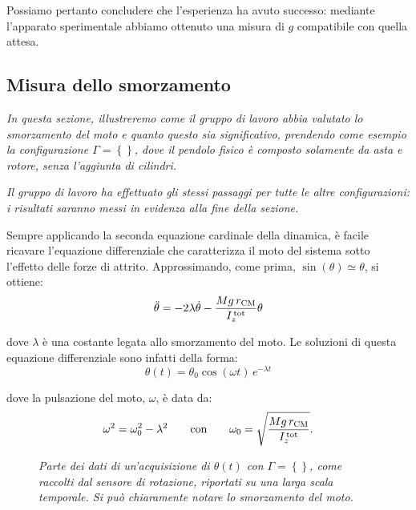 \documentclass{article}
\begin{document}
Possiamo pertanto concludere che l'esperienza ha avuto successo:
mediante l'apparato sperimentale abbiamo ottenuto una misura di $g$
compatibile con quella attesa.

\pagebreak
\subsection{Misura dello smorzamento}

\emph{
  In questa sezione, illustreremo come il gruppo di lavoro abbia
  valutato lo smorzamento del moto e quanto questo sia significativo,
  prendendo come esempio la configurazione $\Gamma=\left\{\right\}$,
  dove il pendolo fisico è composto solamente da asta e rotore, senza
  l'aggiunta di cilindri.
}

\emph{
  Il gruppo di lavoro ha effettuato gli stessi passaggi per tutte le
  altre configurazioni: i risultati saranno messi in evidenza alla
  fine della sezione.
}
\vspace{2mm}

Sempre applicando la seconda equazione cardinale della dinamica,
è facile ricavare l'equazione differenziale che caratterizza il moto
del sistema sotto l'effetto delle forze di attrito.
Approssimando, come prima, $\sin(\theta)\simeq\theta$, si ottiene:
\[ \ddot{\theta} = -2\lambda\dot{\theta} -\frac{Mg\,r_\text{CM}}{I_z^\text{\,tot}} \theta \]

dove $\lambda$ è una costante legata allo smorzamento del moto.
Le soluzioni di questa equazione differenziale sono infatti della forma:
\[\theta(t) = \theta_0\cos(\omega t)\,e^{-\lambda t}\]

dove la pulsazione del moto, $\omega$, è data da:
\[
  \omega^2 = \omega_0^2 - \lambda^2
  \qquad\text{con}\qquad
  \omega_0 = \sqrt{\frac{Mg\,r_\text{CM}}{I_z^\text{\,tot}}}.
\]

\begin{center}
  \begin{figure}[H]
    \caption[]{\emph{
      Parte dei dati di un'acquisizione di $\theta(t)$
      con $\Gamma=\left\{\right\}$,
      come raccolti dal sensore di rotazione,
      riportati su una larga scala temporale.
      Si può chiaramente notare lo smorzamento
      del moto.
    }}
  \end{figure}
\end{center}
\end{document}
